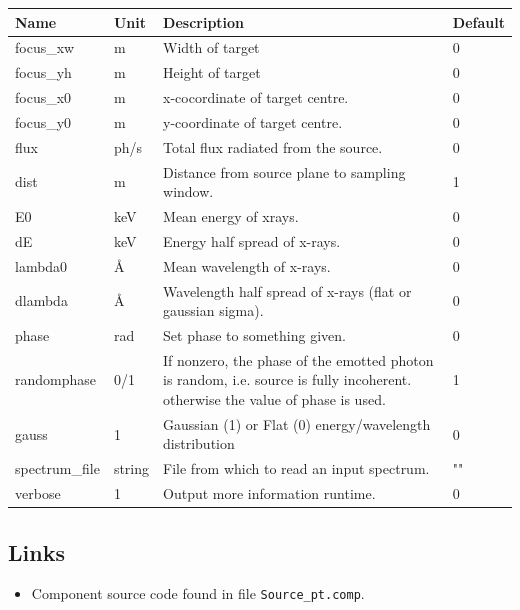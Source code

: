 \begin{longtable}{p{}p{}p{}p{}}
\toprule
\textbf{Name} & \textbf{Unit} & \textbf{Description} & \textbf{Default} \\
\midrule
\endhead
focus\_xw & m & Width of target & 0 \\
focus\_yh & m & Height of target & 0 \\
focus\_x0 & m & x-cocordinate of target centre. & 0 \\
focus\_y0 & m & y-coordinate of target centre. & 0 \\
flux & ph/s & Total flux radiated from the source. & 0 \\
dist & m & Distance from source plane to sampling window. & 1 \\
E0 & keV & Mean energy of xrays. & 0 \\
dE & keV & Energy half spread of x-rays. & 0 \\
lambda0 & \AA{} & Mean wavelength of x-rays. & 0 \\
dlambda & \AA{} & Wavelength half spread of x-rays (flat or gaussian sigma). & 0 \\
phase & rad & Set phase to something given. & 0 \\
randomphase & 0/1 & If nonzero, the phase of the emotted photon is random, i.e. source is fully incoherent. otherwise the value of phase is used. & 1 \\
gauss & 1 & Gaussian (1) or Flat (0) energy/wavelength distribution & 0 \\
spectrum\_file & string & File from which to read an input spectrum. & "" \\
verbose & 1 & Output more information runtime. & 0 \\
\bottomrule
\end{longtable}

\subsection*{Links}
\begin{itemize}
  \item Component source code found in file \texttt{Source\_pt.comp}.
\end{itemize}
